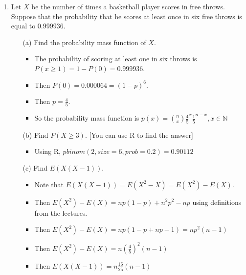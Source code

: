\documentclass{article}
\begin{document}
\begin{enumerate}
\item Let $X$ be the number of times a basketball player scores in free throws. Suppose that the probability that he scores at least once in six free throws is equal to 0.999936.
    \begin{enumerate}
    \item [(a)] Find the probability mass function of  $X$.
        \begin{itemize}
        \item The probability of scoring at least one in six throws is $P(x \geq 1) = 1 - P(0) = 0.999936$.
        \item Then $P(0) = 0.000064 = (1 - p)^{6}$.
        \item Then $p = \frac{4}{5}$.
        \item So the probability mass function is $p(x) = \binom{n}{x} \frac{4}{5}^x \frac{1}{5}^{n-x}, x \in \mathbb{N}$
        \end{itemize}
    \item [(b)] Find $P(X \ge 3)$. [You can use R to find the answer]
        \begin{itemize}
        \item Using R, $pbinom(2, size=6, prob=0.2) = 0.90112$
        \end{itemize}
    \item [(c)] Find $E(X(X-1))$.
        \begin{itemize}
        \item Note that $E(X(X - 1)) = E(X^2 - X) = E(X^2) - E(X)$.
        \item Then $E(X^2) - E(X) = np(1 - p) + n^2p^2 - np$ using definitions from the lectures.
        \item Then $E(X^2) - E(X) = np(1 - p + np - 1) = np^2(n - 1)$
        \item Then $E(X^2) - E(X) = n(\frac{4}{5})^2(n - 1)$
        \item Then $E(X(X - 1)) = n\frac{16}{25}(n - 1)$
        \end{itemize}
    \end{enumerate}


\end{enumerate}
\end{document}
